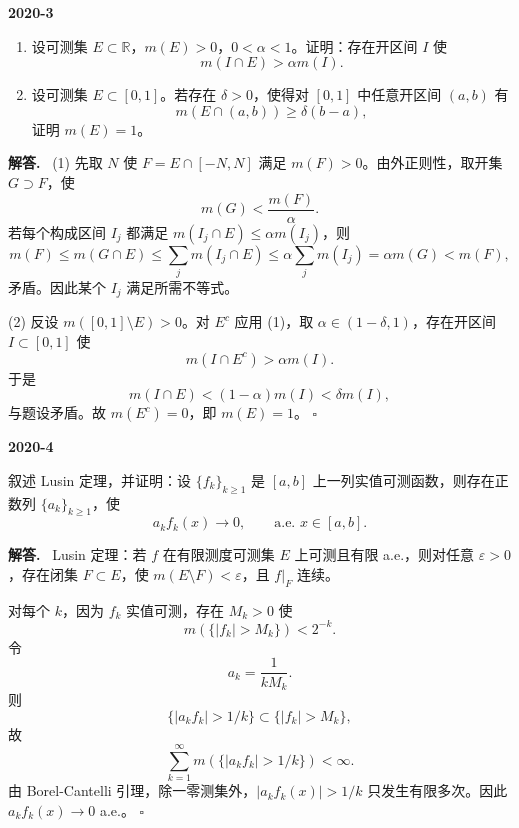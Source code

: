 \documentclass[UTF8]{ctexart}
\newcommand{\R}{\mathbb R}
\newcommand{\eps}{\varepsilon}
\newenvironment{problem}[1]{\par\medskip\noindent\textbf{#1}\par\smallskip}{\par}
\newenvironment{solution}{\par\noindent\textbf{解答.}\ }{\hfill$\square$\par\medskip}
\begin{document}
\begin{problem}{2020-3}
\begin{enumerate}[label=(\arabic*)]
  \item 设可测集 \(E\subset\R\)，\(m(E)>0\)，\(0<\alpha<1\)。证明：存在开区间 \(I\) 使
  \[
    m(I\cap E)>\alpha m(I).
  \]
  \item 设可测集 \(E\subset[0,1]\)。若存在 \(\delta>0\)，使得对 \([0,1]\) 中任意开区间
  \((a,b)\) 有
  \[
    m(E\cap(a,b))\ge \delta(b-a),
  \]
  证明 \(m(E)=1\)。
\end{enumerate}
\end{problem}
\begin{solution}
(1) 先取 \(N\) 使 \(F=E\cap[-N,N]\) 满足 \(m(F)>0\)。由外正则性，取开集
\(G\supset F\)，使
\[
  m(G)<\frac{m(F)}{\alpha}.
\]
若每个构成区间 \(I_j\) 都满足 \(m(I_j\cap E)\le \alpha m(I_j)\)，则
\[
  m(F)\le m(G\cap E)\le \sum_j m(I_j\cap E)
  \le \alpha\sum_j m(I_j)=\alpha m(G)<m(F),
\]
矛盾。因此某个 \(I_j\) 满足所需不等式。

(2) 反设 \(m([0,1]\setminus E)>0\)。对 \(E^c\) 应用 (1)，取
\(\alpha\in(1-\delta,1)\)，存在开区间 \(I\subset[0,1]\) 使
\[
  m(I\cap E^c)>\alpha m(I).
\]
于是
\[
  m(I\cap E)<(1-\alpha)m(I)<\delta m(I),
\]
与题设矛盾。故 \(m(E^c)=0\)，即 \(m(E)=1\)。
\end{solution}

\begin{problem}{2020-4}
叙述 Lusin 定理，并证明：设 \(\{f_k\}_{k\ge1}\) 是 \([a,b]\) 上一列实值可测函数，则存在正数列
\(\{a_k\}_{k\ge1}\)，使
\[
  a_k f_k(x)\to0,\qquad \text{a.e. }x\in[a,b].
\]
\end{problem}
\begin{solution}
Lusin 定理：若 \(f\) 在有限测度可测集 \(E\) 上可测且有限 a.e.，则对任意
\(\eps>0\)，存在闭集 \(F\subset E\)，使 \(m(E\setminus F)<\eps\)，且 \(f|_F\) 连续。

对每个 \(k\)，因为 \(f_k\) 实值可测，存在 \(M_k>0\) 使
\[
  m(\{|f_k|>M_k\})<2^{-k}.
\]
令
\[
  a_k=\frac1{kM_k}.
\]
则
\[
  \{|a_kf_k|>1/k\}\subset\{|f_k|>M_k\},
\]
故
\[
  \sum_{k=1}^\infty m(\{|a_kf_k|>1/k\})<\infty.
\]
由 Borel-Cantelli 引理，除一零测集外，\(|a_kf_k(x)|>1/k\) 只发生有限多次。因此
\(a_kf_k(x)\to0\) a.e.。
\end{solution}
\end{document}
